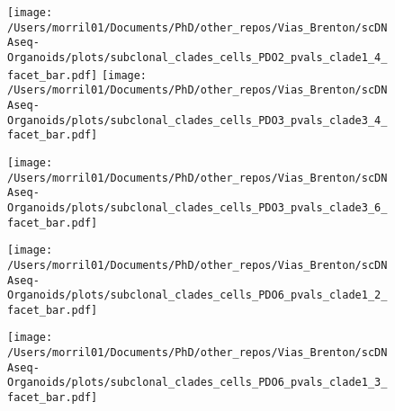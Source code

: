 \documentclass{article}
\begin{document}
\captionsetup[subfigure]{labelformat=empty}
\renewcommand{\familydefault}{\sfdefault}


\setlength{\marginparwidth}{0pt}
\setlength{\marginparsep}{0pt}
\setlength{\topmargin}{-1.3in}


\large{

\begin{figure}[ht]

\hspace{.1in}
\hspace{.1in}

\vspace*{.3in}

 \texttt{[image: /Users/morril01/Documents/PhD/other\_repos/Vias\_Brenton/scDNAseq-Organoids/plots/subclonal\_clades\_cells\_PDO2\_pvals\_clade1\_4\_facet\_bar.pdf]}
 \texttt{[image: /Users/morril01/Documents/PhD/other\_repos/Vias\_Brenton/scDNAseq-Organoids/plots/subclonal\_clades\_cells\_PDO3\_pvals\_clade3\_4\_facet\_bar.pdf]}
 
 \texttt{[image: /Users/morril01/Documents/PhD/other\_repos/Vias\_Brenton/scDNAseq-Organoids/plots/subclonal\_clades\_cells\_PDO3\_pvals\_clade3\_6\_facet\_bar.pdf]}

 \texttt{[image: /Users/morril01/Documents/PhD/other\_repos/Vias\_Brenton/scDNAseq-Organoids/plots/subclonal\_clades\_cells\_PDO6\_pvals\_clade1\_2\_facet\_bar.pdf]}

 \texttt{[image: /Users/morril01/Documents/PhD/other\_repos/Vias\_Brenton/scDNAseq-Organoids/plots/subclonal\_clades\_cells\_PDO6\_pvals\_clade1\_3\_facet\_bar.pdf]}
\end{figure}

}
\end{document}
